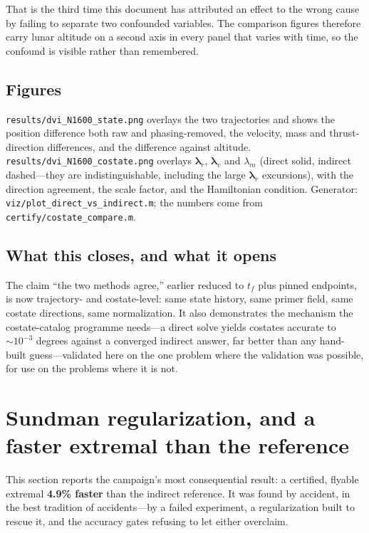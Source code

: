 \documentclass[11pt]{article}
\newcommand{\code}[1]{\texttt{#1}}
\begin{document}
That is the third time this document has attributed an effect to the wrong
cause by failing to separate two confounded variables. The comparison figures
therefore carry lunar altitude on a second axis in every panel that varies with
time, so the confound is visible rather than remembered.

\subsection{Figures}

\code{results/dvi\_N1600\_state.png} overlays the two trajectories and shows the
position difference both raw and phasing-removed, the velocity, mass and
thrust-direction differences, and the difference against altitude.
\code{results/dvi\_N1600\_costate.png} overlays $\boldsymbol{\lambda}_r$,
$\boldsymbol{\lambda}_v$ and $\lambda_m$ (direct solid, indirect dashed---they
are indistinguishable, including the large $\boldsymbol{\lambda}_r$ excursions),
with the direction agreement, the scale factor, and the Hamiltonian condition.
Generator: \code{viz/plot\_direct\_vs\_indirect.m}; the numbers come from
\code{certify/costate\_compare.m}.

\subsection{What this closes, and what it opens}

The claim ``the two methods agree,'' earlier reduced to $t_f$ plus pinned
endpoints, is now trajectory- and costate-level: same state history, same primer
field, same costate directions, same normalization. It also demonstrates the
mechanism the costate-catalog programme needs---a direct solve yields costates
accurate to $\sim10^{-3}$ degrees against a converged indirect answer, far
better than any hand-built guess---validated here on the one problem where the
validation was possible, for use on the problems where it is not.

\section{Sundman regularization, and a faster extremal than the reference}
\label{sec:sundman}

This section reports the campaign's most consequential result: a certified,
flyable extremal \textbf{4.9\% faster} than the indirect reference. It was found
by accident, in the best tradition of accidents---by a failed experiment, a
regularization built to rescue it, and the accuracy gates refusing to let
either overclaim.
\end{document}
